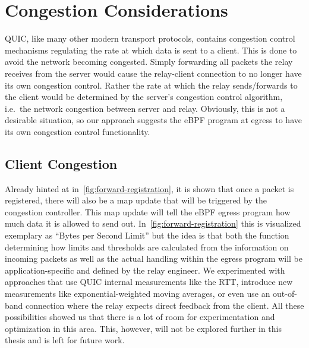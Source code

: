 \section{Congestion Considerations}\label{sec:congestion_considerations}
QUIC, like many other modern transport protocols, contains congestion 
control mechanisms regulating the rate at which data is sent to a client.
This is done to avoid the network becoming congested.
Simply forwarding all packets the relay receives from the server would cause 
the relay-client connection to no longer have its own congestion control.
Rather the rate at which the relay sends/forwards to the client would be determined
by the server's congestion control algorithm, i.e.~the network congestion between 
server and relay.
Obviously, this is not a desirable situation, so our approach suggests the eBPF 
program at egress to have its own congestion control functionality.

\subsection{Client Congestion}
Already hinted at in~\autoref{fig:forward-registration}, it is shown that once a packet is 
registered, there will also be a map update that will be triggered by the congestion controller.
This map update will tell the eBPF egress program how much data it is allowed to send out. 
In~\autoref{fig:forward-registration} this is visualized exemplary as ``Bytes per Second Limit''
but the idea is that both the function determining how limits and thresholds are calculated from 
the information on incoming packets as well as the actual handling within the egress program 
will be application-specific and defined by the relay engineer.
We experimented with approaches that use QUIC internal measurements like the RTT, 
introduce new measurements like exponential-weighted moving averages, or even use an 
out-of-band connection where the relay expects direct feedback from the client.
All these possibilities showed us that there is a lot of room for experimentation and optimization
in this area.
This, however, will not be explored further in this thesis and is left for future work.

